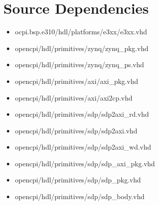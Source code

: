 \documentclass{article}
\begin{document}
\newpage
\section*{Source Dependencies}
\begin{itemize}
	\item
ocpi.bsp.e310/hdl/platforms/e3xx/e3xx.vhd
	\item
opencpi/hdl/primitives/zynq/zynq\_pkg.vhd
	\item
opencpi/hdl/primitives/zynq/zynq\_ps.vhd
	\item
opencpi/hdl/primitives/axi/axi\_pkg.vhd
	\item
opencpi/hdl/primitives/axi/axi2cp.vhd
	\item
opencpi/hdl/primitives/sdp/sdp2axi\_rd.vhd
	\item
opencpi/hdl/primitives/sdp/sdp2axi.vhd
	\item
opencpi/hdl/primitives/sdp/sdp2axi\_wd.vhd
	\item
opencpi/hdl/primitives/sdp/sdp\_axi\_pkg.vhd
	\item
opencpi/hdl/primitives/sdp/sdp\_pkg.vhd
	\item
opencpi/hdl/primitives/sdp/sdp\_body.vhd
\end{itemize}
\end{document}
